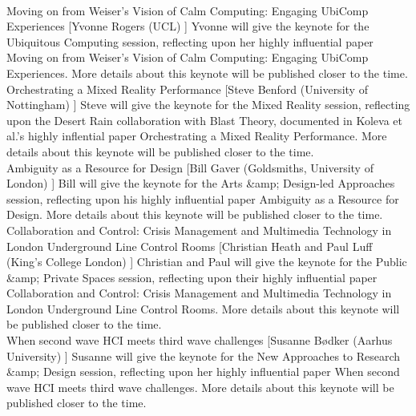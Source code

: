 

\begin{sessions}
 \\
    {Moving on from Weiser’s Vision of Calm Computing: Engaging UbiComp Experiences%
}%
    [Yvonne Rogers (UCL)%
]%
    {Yvonne will give the keynote for the Ubiquitous Computing session, reflecting upon her highly influential paper Moving on from Weiser’s Vision of Calm Computing: Engaging UbiComp Experiences.
More details about this keynote will be published closer to the time.%
}
 \\
    {Orchestrating a Mixed Reality Performance%
}%
    [Steve Benford (University of Nottingham)%
]%
    {Steve will give the keynote for the Mixed Reality session, reflecting upon the Desert Rain collaboration with Blast Theory, documented in Koleva et al.'s highly inflential paper Orchestrating a Mixed Reality Performance.
More details about this keynote will be published closer to the time.%
}
 \\
    {Ambiguity as a Resource for Design%
}%
    [Bill Gaver (Goldsmiths, University of London)%
]%
    {Bill will give the keynote for the Arts \&amp; Design-led Approaches session, reflecting upon his highly influential paper Ambiguity as a Resource for Design.
More details about this keynote will be published closer to the time.%
}
 \\
    {Collaboration and Control: Crisis Management and Multimedia Technology in London Underground Line Control Rooms%
}%
    [Christian Heath and Paul Luff (King's College London)%
]%
    {Christian and Paul will give the keynote for the Public \&amp; Private Spaces session, reflecting upon their highly influential paper Collaboration and Control: Crisis Management and Multimedia Technology in London Underground Line Control Rooms.
More details about this keynote will be published closer to the time.%
}
 \\
    {When second wave HCI meets third wave challenges%
}%
    [Susanne Bødker (Aarhus University)%
]%
    {Susanne will give the keynote for the New Approaches to Research \&amp; Design session, reflecting upon her highly influential paper When second wave HCI meets third wave challenges.
More details about this keynote will be published closer to the time.%
}
\end{sessions}

